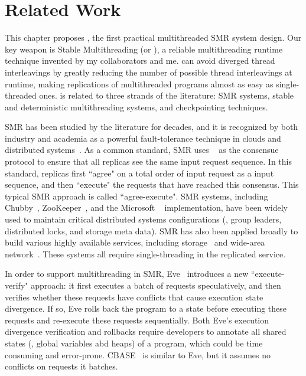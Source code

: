 
\section{Related Work} \label{sec:crane-related}

This chapter proposes \crane, the first practical multithreaded SMR system
design. Our key weapon is Stable Multithreading (or \smt), a reliable
multithreading runtime technique invented by my collaborators and me. \smt can
avoid diverged thread interleavings by greatly reducing the number of possible
thread interleavings at runtime, making replications of multithreaded programs
almost as easy as single-threaded ones. \crane is related to three strands
of the literature:  SMR systems, stable and deterministic multithreading
systems, and checkpointing techniques.


  SMR has been studied by the literature
for decades, and it is recognized by both industry and academia as a powerful
fault-tolerance technique in clouds and distributed systems~\cite{lamportclock,
smr:tutorial}. As a common standard, SMR uses \paxos~\cite{paxos} as the
consensue protocol to ensure that all replicas see the same input request
sequence. In this standard, replicas first ``agree" on a total order of input
request as a input sequence, and then ``execute" the requests that have reached
this consensus. This typical SMR approach is called ``agree-execute". SMR
systems, including Chubby~\cite{chubby:osdi}, ZooKeeper~\cite{zookeeper}, and
the Microsoft \paxos~\cite{paxos} implementation, have been widely used to
maintain critical distributed systems configurations (\eg, group leaders,
distributed locks, and storage meta data). SMR has also been applied broadly to
build various highly available services, including
storage~\cite{paxos:datastore} and wide-area 
network~\cite{mencius:osdi08}. These systems all require single-threading in the
replicated service.

In order to support multithreading in SMR, Eve~\cite{eve:osdi12} introduces a
new ``execute-verify" approach: it first executes a batch of requests
speculatively, and then verifies whether these requests have conflicts that
cause execution state divergence. If so, Eve rolls back the program to a state
before executing these requests and re-execute these requests sequentially. Both
Eve's execution divergence verification and rollbacks require developers to
annotate all shared states (\eg, global variables abd heaps) of a program, which
could be time consuming and error-prone. CBASE~\cite{cbase:dsn04} is similar to
Eve, but it assumes no conflicts on requests it batches.


